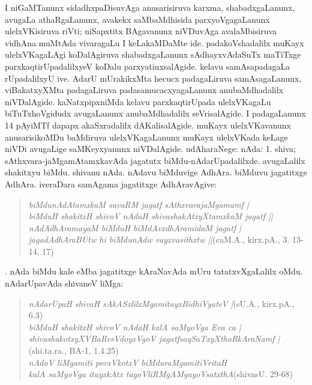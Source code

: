 I niGaMTanunx sidadhxpaDisuvAga anusarisiruva karxma, shabadxgaLanunx, avugaLa athaRgaLanunx, avakekx saMbaMdhisida parxyoVga\-gaLanunx ulelxVKisiruva riVti; niSapxtitx BAgavanunx niVDuvAga avalaMbisiruva vidhAna muMtAda vivaragaLu I keLakaMDaMte ide. padakoVshadalilx muKayx ulelxVKagaLAgi koDalAgiruva shabadxgaLanunx sAdhayxvAdaSuTx maTiTxge parxkaqtirUpadalilxyeV koDalu parxyatinxsa\-lAgide. kelavu samAsapadagaLa rUpadalilxyU ive. AdarU mUrakikxMta hecucx padagaLiruva samAsagaLanunx, viBakatxyXMta padagaLiruva padasamucacxyagaLanunx anubaMdhadalilx niVDalAgide. kaNatxpipxniMda kelavu parxkaqtirUpada ulelxVKagaLu biTuTxhoVgidudx avugaLanunx anubaMdhadalilx seVrisalAgide. I padagaLanunx 14 pAyiMTf dapapx akaSxradalilx dAKalisalAgide. muKayx ulelxVKavanunx anusarisikoMDu baMdiruva ulelxVKagaLanunx muKayx ulelxVKada keLage niVDi avugaLige saMKeyxyanunx niVDalAgide. udAharaNege: nAda: 1. shiva; sAthxvara-jaMgamAtamxkavAda jagatutx biMdu-nAdarUpa\-dalilxde. avugaLalilx shakitxyu biMdu. shivanu nAda. nAdavu biMduvige AdhAra. biMduvu jagatitxge AdhAra. iveraDara samAgama jagatitxge AdhAravAgive:
\begin{quote}
{\sl biMdunAdAtamxkaM savaRM jagatf sAthxvarajaMgamamf |}\\[3pt]
{\sl biMduH shakitxH shivoV nAdaH shivashakAtxyXtamxkaM jagatf ||}\\[7pt]
{\sl nAdAdhAramayaM biMduH biMdAvxdhAramidaM jagatf |}\\[3pt]
{\sl jagadAdhAraBUtw hi biMdunAdw vayxvasithxtw ||}\hfill (caM.A., kirx.pA., 3. 13-14, 17)
\end{quote}

. nAda biMdu kale eMba jagatitxge kAraNavAda mUru tatatxvXgaLalilx oMdu. nAdarUpavAda shivaneV liMga:
\begin{quote}
{\sl nAdarUpaH shivaH sAkASxlilxMgamitayxBidhiVyateV |}\hfill {(sU.A., kirx.pA., 6.3)}\\[7pt]
{\sl biMduH shakitxH shivoV nAdaH kalA saMyoVga Eva ca |}\\[2pt]
{\sl shivashakotxyXVBaRveVdoyxVgoV jagatfsaqSaTxyXthaRkAraNamf |}\hfill {(shi.ta.ra., BA-1, 1.4.25)}\\[7pt]
{\sl nAdoV liMgamiti porxVkotxV biMduraMgamitiVritaH}\\[2pt]
{\sl kalA saMyoVga ituyxkAtx tayoVliRMgAMgayoVsatxthA}\hfill {(shivasU. 29-68)}
\end{quote}

